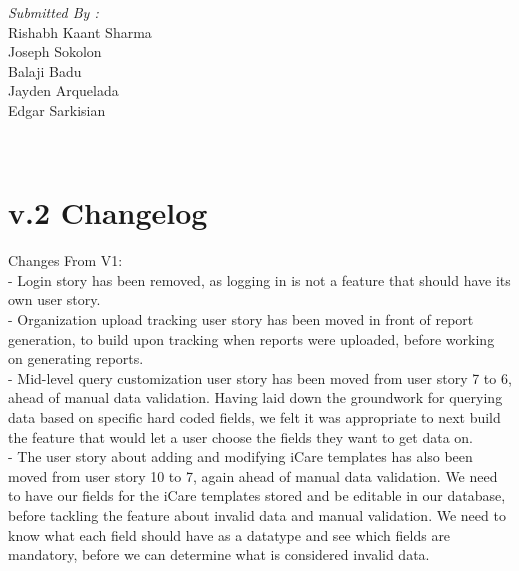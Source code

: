 \documentclass[12pt]{article}
\begin{document}
\begin{titlepage}
\begin{minipage}{0.4\textwidth}
			\begin{flushright} \large
			\emph{Submitted By :} \\
			Rishabh Kaant Sharma\\
            Joseph Sokolon\\
            Balaji Badu\\
            Jayden Arquelada\\
            Edgar Sarkisian\\
		\end{flushright}
        
	\end{minipage}\\[2 cm]
	
	
    
    
    
    
	
\end{titlepage}


\textcolor{black}{\tableofcontents}
\pagebreak

\section{v.2 Changelog}
Changes From V1:\\
- Login story has been removed, as logging in is not a feature that should have its own user story.\\
- Organization upload tracking user story has been moved in front of report generation, to build upon tracking when reports were uploaded, before working on generating reports.\\
- Mid-level query customization user story has been moved from user story 7 to 6, ahead of manual data validation. Having laid down the groundwork for querying data based on specific hard coded fields, we felt it was appropriate to next build the feature that would let a user choose the fields they want to get data on.\\
- The user story about adding and modifying iCare templates has also been moved from user story 10 to 7, again ahead of manual data validation. We need to have our fields for the iCare templates stored and be editable in our database, before tackling the feature about invalid data and manual validation. We need to know what each field should have as a datatype and see which fields are mandatory, before we can determine what is considered invalid data.\\
\end{document}
